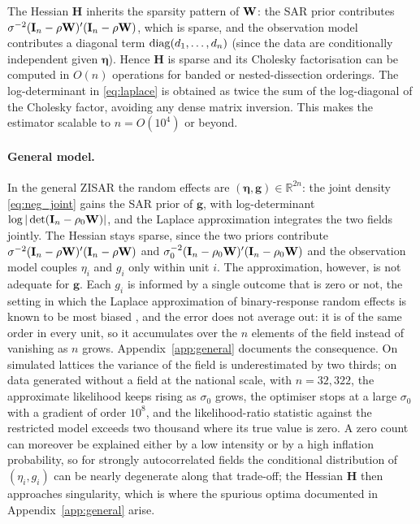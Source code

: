 The Hessian $\mathbf{H}$ inherits the sparsity pattern of $\mathbf{W}$: the SAR prior contributes $\sigma^{-2}(\mathbf{I}_n - \rho\mathbf{W})'(\mathbf{I}_n - \rho\mathbf{W})$, which is sparse, and the observation model contributes a diagonal term $\operatorname{diag}(d_1,\ldots,d_n)$ (since the data are conditionally independent given $\boldsymbol{\eta}$).
Hence $\mathbf{H}$ is sparse and its Cholesky factorisation can be computed in $O(n)$ operations for banded or nested-dissection orderings.
The log-determinant in \eqref{eq:laplace} is obtained as twice the sum of the log-diagonal of the Cholesky factor, avoiding any dense matrix inversion.
This makes the estimator scalable to $n = O(10^4)$ or beyond.

\paragraph{General model.}
In the general ZISAR the random effects are $(\boldsymbol{\eta}, \mathbf{g}) \in \mathbb{R}^{2n}$: the joint density \eqref{eq:neg_joint} gains the SAR prior of $\mathbf{g}$, with log-determinant $\log|\det(\mathbf{I}_n - \rho_0\mathbf{W})|$, and the Laplace approximation integrates the two fields jointly.
The Hessian stays sparse, since the two priors contribute $\sigma^{-2}(\mathbf{I}_n - \rho\mathbf{W})'(\mathbf{I}_n - \rho\mathbf{W})$ and $\sigma_0^{-2}(\mathbf{I}_n - \rho_0\mathbf{W})'(\mathbf{I}_n - \rho_0\mathbf{W})$ and the observation model couples $\eta_i$ and $g_i$ only within unit $i$.
The approximation, however, is not adequate for $\mathbf{g}$.
Each $g_i$ is informed by a single outcome that is zero or not, the setting in which the Laplace approximation of binary-response random effects is known to be most biased \citep{joe2008}, and the error does not average out: it is of the same order in every unit, so it accumulates over the $n$ elements of the field instead of vanishing as $n$ grows.
Appendix~\ref{app:general} documents the consequence.
On simulated lattices the variance of the field is underestimated by two thirds; on data generated without a field at the national scale, with $n = 32{,}322$, the approximate likelihood keeps rising as $\sigma_0$ grows, the optimiser stops at a large $\sigma_0$ with a gradient of order $10^8$, and the likelihood-ratio statistic against the restricted model exceeds two thousand where its true value is zero.
A zero count can moreover be explained either by a low intensity or by a high inflation probability, so for strongly autocorrelated fields the conditional distribution of $(\eta_i, g_i)$ can be nearly degenerate along that trade-off; the Hessian $\mathbf{H}$ then approaches singularity, which is where the spurious optima documented in Appendix~\ref{app:general} arise.

